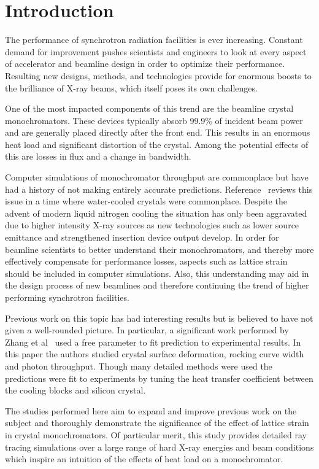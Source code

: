 \documentclass[preprint]{iucr}              %
\begin{document}
\section{Introduction}

The performance of synchrotron radiation facilities is ever increasing. Constant demand for improvement pushes scientists and engineers to look at every aspect of accelerator and beamline design in order to optimize their performance. Resulting new designs, methods, and technologies provide for enormous boosts to the brilliance of X-ray beams, which itself poses its own challenges.

One of the most impacted components of this trend are the beamline crystal monochromators. These devices typically absorb 99.9\% of incident beam power~\cite{willmott} and are generally placed directly after the front end. This results in an enormous heat load and significant distortion of the crystal. Among the potential effects of this are losses in flux and a change in bandwidth.

Computer simulations of monochromator throughput are commonplace but have had a history of not making entirely accurate predictions. Reference~\cite{innacuratepredictions} reviews this issue in a time where water-cooled crystals were commonplace. Despite the advent of modern liquid nitrogen cooling the situation has only been aggravated due to higher intensity X-ray sources as new technologies such as lower source emittance and strengthened insertion device output develop. In order for beamline scientists to better understand their monochromators, and thereby more effectively compensate for performance losses, aspects such as lattice strain should be included in computer simulations. Also, this understanding may aid in the design process of new beamlines and therefore continuing the trend of higher performing synchrotron facilities.

Previous work on this topic has had interesting results but is believed to have not given a well-rounded picture. In particular, a significant work performed by Zhang et al~\cite{Zhang} used a free parameter to fit prediction to experimental results. In this paper the authors studied crystal surface deformation, rocking curve width and photon throughput. Though many detailed methods were used the predictions were fit to experiments by tuning the heat transfer coefficient between the cooling blocks and silicon crystal.

The studies performed here aim to expand and improve previous work on the subject and thoroughly demonstrate the significance of the effect of lattice strain in crystal monochromators. Of particular merit, this study provides detailed ray tracing simulations over a large range of hard X-ray energies and beam conditions which inspire an intuition of the effects of heat load on a monochromator.
\end{document}
